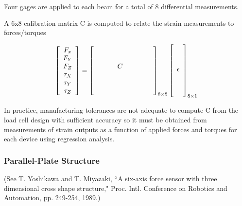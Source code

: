 Four gages are applied to each beam for a total of 8 differential
measurements.

A 6x8 calibration matrix C is computed to relate the strain measurements
to forces/torques

\[
\left[ \begin{array}{c}
    F_x \\ F_Y \\ F_Z \\ \tau_X \\ \tau_Y \\ \tau_Z
    \end{array}  \right ]
    =
    \left[ \begin{array}{cccccccc}
     & & & & & & &  \\
     & & & & & & &  \\
     & & & C & & & &  \\
     & & & & & & &  \\
     & & & & & & &  \\
     & & & & & & &  \\
     \end{array} \right ]_{6 \times 8}
    \left[ \begin{array}{c}
    \vspace{0.1in}\\ \\ \epsilon \\ \\\vspace{0.15in}  \\
    \end{array}  \right ]_{8 \times 1}
\]

In practice, manufacturing tolerances are not adequate to compute
C from the load cell design with sufficient accuracy
so it must be obtained from measurements of strain outputs as a function
of applied forces and torques for each device using regression
analysis.




\subsubsection{Parallel-Plate Structure}
{\small
(See T. Yoshikawa and T. Miyazaki, ``A six-axis force sensor with
three dimensional cross shape structure," Proc. Intl. Conference
on Robotics and Automation, pp. 249-254, 1989.)
}


